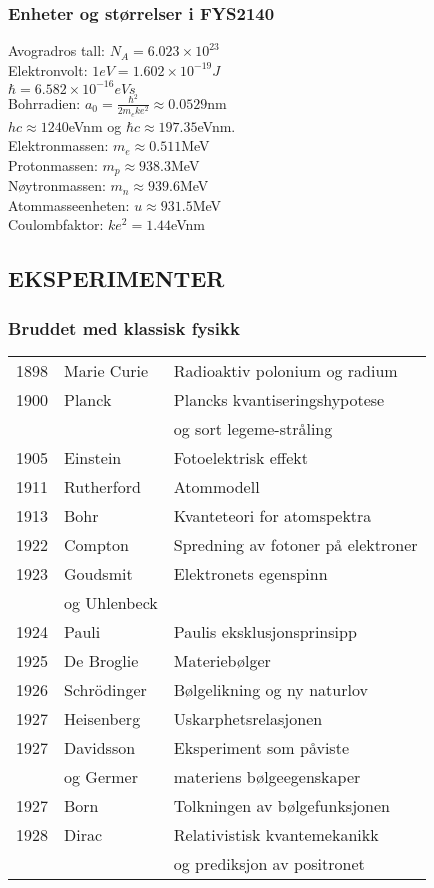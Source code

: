 \documentclass[a4paper, norsk, 8pt]{article}
\begin{document}
\tiny
\begin{multicols*}{3}
\subsubsection*{\scriptsize Enheter og størrelser i FYS2140}
Avogradros tall: $N_A=6.023\times 10^{23}$ \\
Elektronvolt: $1 eV = 1.602\times10^{-19}J$ \\
$\hbar = 6.582\times10^{-16}eVs$ \\
Bohrradien: $a_0=\frac{\hbar^2}{2m_eke^2}\approx0.0529$nm \\
$hc\approx1240$eVnm og $\hbar c\approx197.35$eVnm. \\
Elektronmassen: $m_e\approx 0.511$MeV \\
Protonmassen: $m_p\approx 938.3$MeV \\
Nøytronmassen: $m_n\approx 939.6$MeV \\
Atommasseenheten: $u\approx 931.5$MeV \\
Coulombfaktor: $ke^2=1.44$eVnm

\subsection*{\footnotesize  EKSPERIMENTER}


\subsubsection*{\scriptsize Bruddet med klassisk fysikk}
\begin{tabular}{ l l l}
1898 & Marie Curie & Radioaktiv polonium og radium \\
1900 & Planck      & Plancks kvantiseringshypotese \\
     &             & og sort legeme-stråling \\
1905 & Einstein    & Fotoelektrisk effekt \\  
1911 & Rutherford  & Atommodell \\
1913 & Bohr        & Kvanteteori for atomspektra \\
1922 & Compton     & Spredning av fotoner på elektroner \\
1923 & Goudsmit    & Elektronets egenspinn \\
     & og Uhlenbeck&  \\
1924 & Pauli       & Paulis eksklusjonsprinsipp \\
1925 & De Broglie  & Materiebølger \\
1926 & Schrödinger & Bølgelikning og ny naturlov \\
1927 & Heisenberg  & Uskarphetsrelasjonen \\
1927 & Davidsson   & Eksperiment som påviste  \\
     & og Germer   & materiens bølgeegenskaper  \\
1927 & Born        & Tolkningen av bølgefunksjonen \\
1928 & Dirac       & Relativistisk kvantemekanikk \\
     &             & og prediksjon av positronet  \\
\end{tabular}



\end{multicols*}
\end{document}
